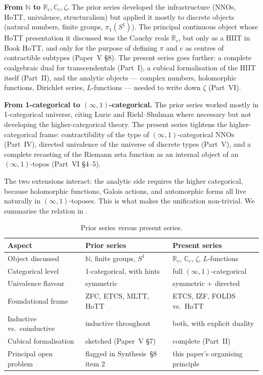 \documentclass[12pt]{article}
\theoremstyle{definition}
\theoremstyle{remark}
\newcommand{\N}{\mathbb{N}}
\newcommand{\R}{\mathbb{R}}
\newcommand{\C}{\mathbb{C}}
\newcommand{\Rc}{\R_{c}}
\newcommand{\Cc}{\C_{c}}
\begin{document}
\textbf{From $\N$ to $\Rc, \Cc, \zeta$.} The prior series developed the
infrastructure (NNOs, HoTT, univalence, structuralism) but applied it
mostly to discrete objects (natural numbers, finite groups, $\pi_1(S^1)$).
The principal continuous object whose HoTT presentation it discussed was
the Cauchy reals $\Rc$, but only as a HIIT in Book HoTT, and only for the
purpose of defining $\pi$ and $e$ as centres of contractible subtypes
(Paper~V \S 8). The present series goes further: a complete coalgebraic
dual for transcendentals (Part~I), a cubical formalisation of the HIIT
itself (Part~II), and the analytic objects --- complex numbers,
holomorphic functions, Dirichlet series, $L$-functions --- needed to write
down $\zeta$ (Part~VI).

\textbf{From 1-categorical to $(\infty,1)$-categorical.} The prior series
worked mostly in 1-categorical universe, citing Lurie and Riehl--Shulman
where necessary but not developing the higher-categorical theory. The
present series tightens the higher-categorical frame: contractibility of
the type of $(\infty,1)$-categorical NNOs (Part~IV), directed univalence
of the universe of discrete types (Part~V), and a complete recasting of
the Riemann zeta function as an internal object of an $(\infty,1)$-topos
(Part~VI \S 4--5).

The two extensions interact: the analytic side requires the higher
categorical, because holomorphic functions, Galois actions, and automorphic
forms all live naturally in $(\infty,1)$-toposes. This is what makes the
unification non-trivial. We summarise the relation in
.

\begin{table}[hbtp]
\centering
\begin{tabular}{@{}lll@{}}
\toprule
Aspect & Prior series & Present series \\
\midrule
Object discussed & $\N$, finite groups, $S^1$ & $\Rc$, $\Cc$, $\zeta$, $L$-functions \\
Categorical level & 1-categorical, with hints & full $(\infty,1)$-categorical \\
Univalence flavour & symmetric & symmetric + directed \\
Foundational frame & ZFC, ETCS, MLTT, HoTT & ETCS, IZF, FOLDS vs.\ HoTT \\
Inductive vs.\ coinductive & inductive throughout & both, with explicit duality \\
Cubical formalisation & sketched (Paper~V \S 7) & complete (Part~II) \\
Principal open problem & flagged in Synthesis~\S 8 item 2 & this paper's organising principle \\
\bottomrule
\end{tabular}
\caption{Prior series versus present series.}\label{tab:priorVsCurrent}
\end{table}
\end{document}
